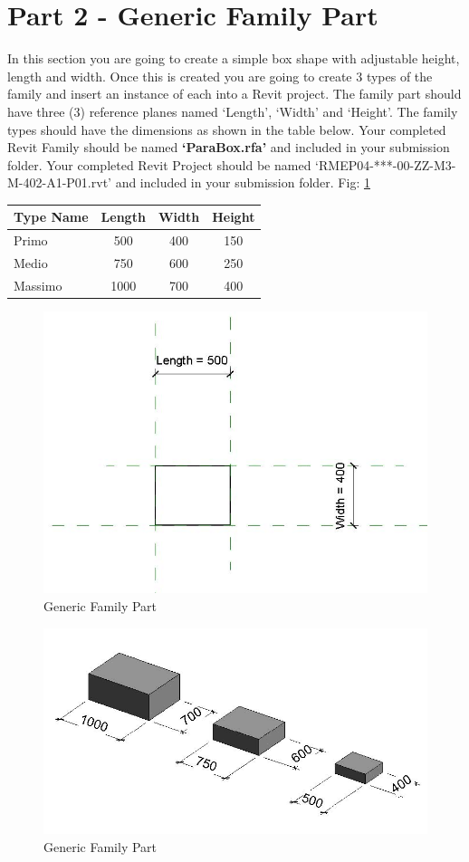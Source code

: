 \newpage


\section*{Part 2 - Generic Family Part}
In this section you are going to create a simple box shape with adjustable height, length and width. Once this is created you are going to create 3 types of the family and insert an instance of each into a Revit project. The family part should have three (3) reference planes named ‘Length’, ‘Width’ and ‘Height’. The family types should have the dimensions as shown in the table below.  Your completed Revit Family should be named \textbf{‘ParaBox.rfa’} and included in your submission folder.  Your completed Revit Project should be named ‘RMEP04-***-00-ZZ-M3-M-402-A1-P01.rvt’ and included in your submission folder. Fig: \ref{fig:GenericFamilyPart1}\\


\begin{tabularx}{\textwidth}{ |X|c|c|c| }
	\hline
	\textbf{Type Name} & Length & Width & Height \\
	\hline 
	Primo & 500 & 400 & 150\\
	Medio & 750 & 600 & 250\\
	Massimo & 1000 & 700 & 400\\
	\hline
\end{tabularx}


\begin{figure}[h]
	\centering
	\includegraphics[width=0.7\linewidth]{img/ParaBox1.jpg}
	\caption{Generic Family Part}
	\label{fig:GenericFamilyPart1}
\end{figure}


\begin{figure}[h]
	\centering
	\includegraphics[width=0.7\linewidth]{img/ParaBox2.jpg}
	\caption{Generic Family Part}
	\label{fig:GenericFamilyPart2}
\end{figure}


